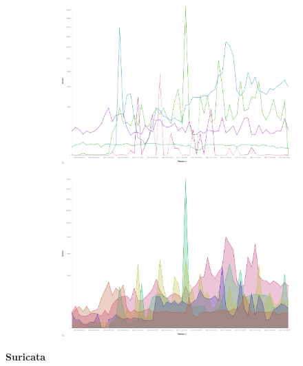 \begin{figure}
    \centering
   
    \begin{subfigure}[b]{0.49\textwidth}
        \centering
        \includegraphics[width=\textwidth]{figures/tpot-overview-histogram.png}
        \caption{}
        \label{fig:tpot-attack-histogram}
    \end{subfigure}
    \hfill
    \begin{subfigure}[b]{0.49\textwidth}
        \centering
        \includegraphics[width=\textwidth]{figures/tpot-attack-histogram.png}
        \caption{}
        \label{fig:tpot-overview-histogram}
    \end{subfigure}
    \caption[]{}
    \label{fig:attacks}
\end{figure}

\textbf{Suricata}


